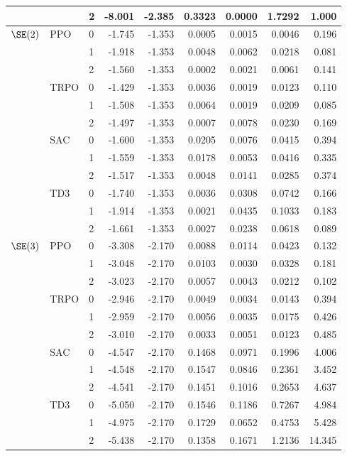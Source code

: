 \begin{tabular}{lllrrrrrr}
 &  & 2 & -8.001 & -2.385 & 0.3323 & 0.0000 & 1.7292 & 1.000 \\
\midrule
$\SE(2)$ & PPO & 0 & -1.745 & -1.353 & 0.0005 & 0.0015 & 0.0046 & 0.196 \\
 &  & 1 & -1.918 & -1.353 & 0.0048 & 0.0062 & 0.0218 & 0.081 \\
 &  & 2 & -1.560 & -1.353 & 0.0002 & 0.0021 & 0.0061 & 0.141 \\
 & TRPO & 0 & -1.429 & -1.353 & 0.0036 & 0.0019 & 0.0123 & 0.110 \\
 &  & 1 & -1.508 & -1.353 & 0.0064 & 0.0019 & 0.0209 & 0.085 \\
 &  & 2 & -1.497 & -1.353 & 0.0007 & 0.0078 & 0.0230 & 0.169 \\
 & SAC & 0 & -1.600 & -1.353 & 0.0205 & 0.0076 & 0.0415 & 0.394 \\
 &  & 1 & -1.559 & -1.353 & 0.0178 & 0.0053 & 0.0416 & 0.335 \\
 &  & 2 & -1.517 & -1.353 & 0.0048 & 0.0141 & 0.0285 & 0.374 \\
 & TD3 & 0 & -1.740 & -1.353 & 0.0036 & 0.0308 & 0.0742 & 0.166 \\
 &  & 1 & -1.914 & -1.353 & 0.0021 & 0.0435 & 0.1033 & 0.183 \\
 &  & 2 & -1.661 & -1.353 & 0.0027 & 0.0238 & 0.0618 & 0.089 \\
\midrule
$\SE(3)$ & PPO & 0 & -3.308 & -2.170 & 0.0088 & 0.0114 & 0.0423 & 0.132 \\
 &  & 1 & -3.048 & -2.170 & 0.0103 & 0.0030 & 0.0328 & 0.181 \\
 &  & 2 & -3.023 & -2.170 & 0.0057 & 0.0043 & 0.0212 & 0.102 \\
 & TRPO & 0 & -2.946 & -2.170 & 0.0049 & 0.0034 & 0.0143 & 0.394 \\
 &  & 1 & -2.959 & -2.170 & 0.0056 & 0.0035 & 0.0175 & 0.426 \\
 &  & 2 & -3.010 & -2.170 & 0.0033 & 0.0051 & 0.0123 & 0.485 \\
 & SAC & 0 & -4.547 & -2.170 & 0.1468 & 0.0971 & 0.1996 & 4.006 \\
 &  & 1 & -4.548 & -2.170 & 0.1547 & 0.0846 & 0.2361 & 3.452 \\
 &  & 2 & -4.541 & -2.170 & 0.1451 & 0.1016 & 0.2653 & 4.637 \\
 & TD3 & 0 & -5.050 & -2.170 & 0.1546 & 0.1186 & 0.7267 & 4.984 \\
 &  & 1 & -4.975 & -2.170 & 0.1729 & 0.0652 & 0.4753 & 5.428 \\
 &  & 2 & -5.438 & -2.170 & 0.1358 & 0.1671 & 1.2136 & 14.345 \\
\bottomrule
\end{tabular}